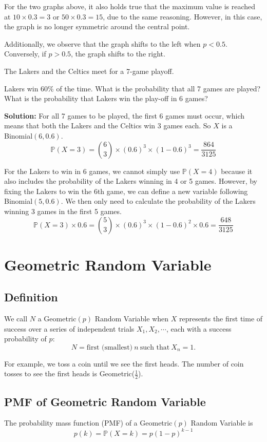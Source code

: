 For the two graphs above, it also holds true that the maximum value is reached at \(10 \times 0.3 = 3\) or \(50 \times 0.3 = 15\), due to the same reasoning. However, in this case, the graph is no longer symmetric around the central point.

Additionally, we observe that the graph shifts to the left when \(p < 0.5\). Conversely, if \(p > 0.5\), the graph shifts to the right.

\begin{eg}
The Lakers and the Celtics meet for a 7-game playoff. 

Lakers win 60\% of the time. What is the probability that all 7 games are played? What is the probability that Lakers win the play-off in 6 games? 

\textbf{Solution:} 
For all 7 games to be played, the first 6 games must occur, which means that both the Lakers and the Celtics win 3 games each. So \(X\) is a Binomial\((6, 0.6)\). 
\[
  \mathbb{P}(X = 3) = \binom{6}{3} \times (0.6)^3 \times (1 - 0.6)^3 = \dfrac{864}{3125}
\]

For the Lakers to win in 6 games, we cannot simply use \(\mathbb{P}(X = 4)\) because it also includes the probability of the Lakers winning in 4 or 5 games. However, by fixing the Lakers to win the 6th game, we can define a new variable following Binomial\((5, 0.6)\). We then only need to calculate the probability of the Lakers winning 3 games in the first 5 games.
\[
  \mathbb{P}(X = 3) \times 0.6 = \binom{5}{3} \times (0.6)^3 \times (1 - 0.6)^2 \times 0.6 = \dfrac{648}{3125}
\]
\end{eg}

\section{Geometric Random Variable}
\subsection{Definition}
We call \(N\) a Geometric\((p)\) Random Variable when \(X\) represents the first time of success over a series of independent trials \(X_1, X_2, \cdots\), each with a success probability of \(p\):
\[
  N = \text{first (smallest)}\ n\ \text{such that}\ X_n = 1.
\]

For example, we toss a coin until we see the first heads. The number of coin tosses to see the first heads is Geometric(\(\frac{1}{2}\)). 

\subsection{PMF of Geometric Random Variable}
The probability mass function (PMF) of a Geometric\((p)\) Random Variable is 
\[
  p(k) = \mathbb{P}(X = k) = p(1 - p)^{k-1} 
\]

